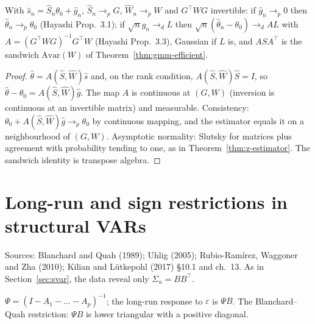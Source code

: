 \begin{theorem}
\label{thm:gmm-asymptotic}
\leanok
{}
With $\hat s_n = \hat S_n\theta_0 + \hat g_n$, $\hat S_n\to_p G$, $\hat W_n\to_p W$ and $G^\top WG$ invertible:
if $\hat g_n\to_p 0$ then $\hat\theta_n\to_p\theta_0$ (Hayashi Prop.~3.1); if $\sqrt n\hat g_n\to_d L$ then
$\sqrt n(\hat\theta_n-\theta_0)\to_d AL$ with $A = (G^\top WG)^{-1}G^\top W$ (Hayashi Prop.~3.3), Gaussian if $L$ is, and
$ASA^\top$ is the sandwich $\mathrm{Avar}(W)$ of Theorem~\ref{thm:gmm-efficient}.
\end{theorem}
\begin{proof}
\leanok
$\hat\theta = A(\hat S,\hat W)\hat s$ and, on the rank condition, $A(\hat S,\hat W)\hat S = I$, so
$\hat\theta - \theta_0 = A(\hat S,\hat W)\hat g$. The map $A$ is continuous at $(G,W)$ (inversion is continuous at an
invertible matrix) and measurable. Consistency: $\theta_0 + A(\hat S,\hat W)\hat g\to_p\theta_0$ by continuous mapping,
and the estimator equals it on a neighbourhood of $(G,W)$. Asymptotic normality: Slutsky for matrices plus agreement
with probability tending to one, as in Theorem~\ref{thm:z-estimator}. The sandwich identity is transpose algebra.
\end{proof}

\section{Long-run and sign restrictions in structural VARs}
\label{sec:svar-restrictions}

Sources: Blanchard and Quah (1989); Uhlig (2005); Rubio-Ramírez, Waggoner and Zha (2010); Kilian and Lütkepohl (2017)
\S10.1 and ch.~13. As in Section~\ref{sec:svar}, the data reveal only $\Sigma_u = BB^\top$.

\begin{definition}
\label{def:long-run}
\leanok
{}
$\Psi = (I - A_1 - \dots - A_p)^{-1}$; the long-run response to $\varepsilon$ is $\Psi B$. The Blanchard--Quah
restriction: $\Psi B$ is lower triangular with a positive diagonal.
\end{definition}


